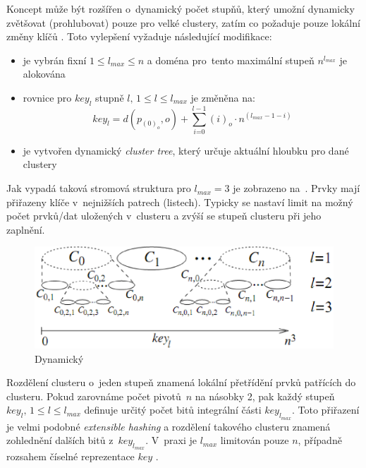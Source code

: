 Koncept  může být rozšířen o~dynamický počet stupňů, který umožní  dynamicky zvětšovat (prohlubovat)
pouze pro velké clustery, zatím co 
požaduje pouze lokální změny klíčů . Toto vylepšení vyžaduje
následující modifikace:
\begin{itemize}
\item je vybrán fixní  $1\leq l_{max}\leq n$
a doména pro~tento maximální stupeň $n^{l_{max}}$ je alokována
\item rovnice  pro $key_{l}$ stupně $l,\,1\leq l\leq l_{max}$
je změněna na:
\begin{equation}
key_{l}=d(p_{(0)_{o}},o)+\sum_{i\text{=0}}^{l-1}(i)_{o}\cdot n{}^{(l_{max}-1-i)}\label{eq:M-Index-key-max-level}
\end{equation}

\item je vytvořen dynamický \emph{cluster tree}, který určuje aktuální hloubku
pro dané \MIndex{} clustery
\end{itemize}
Jak vypadá taková stromová struktura pro $l_{max}=3$ je zobrazeno
na~. Prvky mají přiřazeny
klíče v~nejnižších patrech (listech). Typicky se nastaví limit na
možný počet prvků/dat uložených v~clusteru a zvýší se stupeň clusteru
při jeho zaplnění.

\begin{figure}[t]
\centering
\includegraphics[scale=0.5]{m-index-dynamic-cluster}
\caption{Dynamický \MIndex{}}
\label{fig:Dynamic-Cluster-Tree}
\end{figure}

Rozdělení clusteru o~jeden stupeň znamená lokální přetřídění prvků
patřících do clusteru. Pokud zarovnáme počet pivotů~$n$ na násobky
2, pak každý stupeň $key_{l},\,1\leq l\leq l_{max}$ definuje určitý
počet bitů integrální části $key_{l_{max}}$\@. Toto přiřazení je
velmi podobné \emph{extensible hashing}\cite{Fagin:1979:EHF:320083.320092}
a rozdělení takového clusteru znamená zohlednění dalších bitů z~$key_{l_{max}}$\@.
V~praxi je $l_{max}$ limitován pouze $n$, případně rozsahem číselné
reprezentace $key$ \@.


